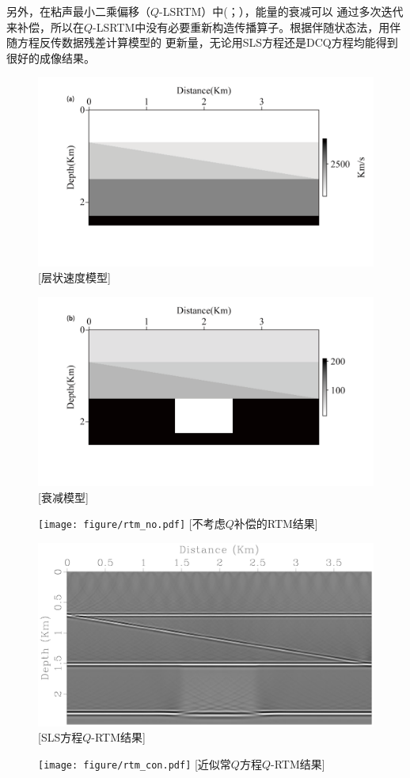 另外，在粘声最小二乘偏移（$Q$-LSRTM）中(；），能量的衰减可以
通过多次迭代来补偿，所以在$Q$-LSRTM中没有必要重新构造传播算子。根据伴随状态法，用伴随方程反传数据残差计算模型的
更新量，无论用SLS方程还是DCQ方程均能得到很好的成像结果。
\begin{figure}[!htbp]
	    \centering
		\includegraphics[width=0.9\linewidth]{figure/lens_v.pdf}
		[层状速度模型]
		\label{fig:lens_v}
\end{figure}
\begin{figure}[!htbp]
	    \centering
		\includegraphics[width=0.9\linewidth]{figure/lens_q.pdf}
		\label{fig:lens_q}
\end{figure}
\begin{figure}[!htbp]
	    \centering
		\texttt{[image: figure/rtm\_no.pdf]}
		[不考虑$Q$补偿的RTM结果]
		\label{fig:rtm_no}
\end{figure}
\begin{figure}[!htbp]
	    \centering
		\includegraphics[width=0.6\linewidth]{figure/rtm_sls}
		[SLS方程$Q$-RTM结果]
		\label{fig:rtm_sls}
\end{figure}
\begin{figure}[!htbp]
	    \centering
		\texttt{[image: figure/rtm\_con.pdf]}
		[近似常$Q$方程$Q$-RTM结果]
		\label{fig:rtm_con}
\end{figure}
